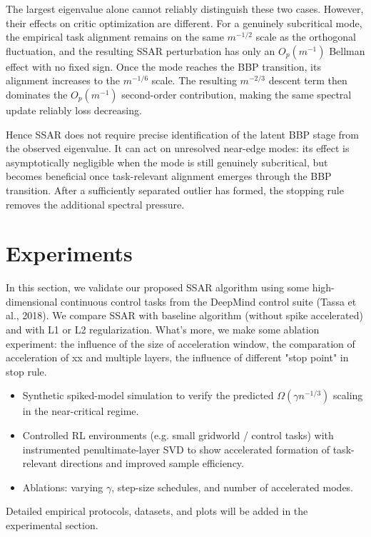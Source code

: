 The largest eigenvalue alone cannot reliably distinguish these two cases.
However, their effects on critic optimization are different. For a genuinely
subcritical mode, the empirical task alignment remains on the same
$m^{-1/2}$ scale as the orthogonal fluctuation, and the resulting SSAR
perturbation has only an $O_p(m^{-1})$ Bellman effect with no fixed sign.
Once the mode reaches the BBP transition, its alignment increases to the
$m^{-1/6}$ scale. The resulting $m^{-2/3}$ descent term then dominates the
$O_p(m^{-1})$ second-order contribution, making the same spectral update
reliably loss decreasing.

Hence SSAR does not require precise identification of the latent BBP stage
from the observed eigenvalue. It can act on unresolved near-edge modes:
its effect is asymptotically negligible when the mode is still genuinely
subcritical, but becomes beneficial once task-relevant alignment emerges
through the BBP transition. After a sufficiently separated outlier has
formed, the stopping rule removes the additional spectral pressure.


\section{Experiments }
\label{sec:experiments}

In this section, we validate our proposed SSAR algorithm using some high-dimensional continuous control tasks from the DeepMind control suite (Tassa et al., 2018).  We compare SSAR with baseline algorithm (without spike accelerated) and with L1 or L2 regularization. What's more, we make some ablation experiment: the influence of  the size of acceleration window, the comparation of acceleration of xx and multiple layers, the influence of different "stop point" in stop rule.



\begin{itemize}
  \item Synthetic spiked-model simulation to verify the predicted $\Omega(\gamma n^{-1/3})$ scaling in the near-critical regime.
  \item Controlled RL environments (e.g. small gridworld / control tasks) with instrumented penultimate-layer SVD to show accelerated formation of task-relevant directions and improved sample efficiency.
  \item Ablations: varying $\gamma$, step-size schedules, and number of accelerated modes.
\end{itemize}
Detailed empirical protocols, datasets, and plots will be added in the experimental section.

